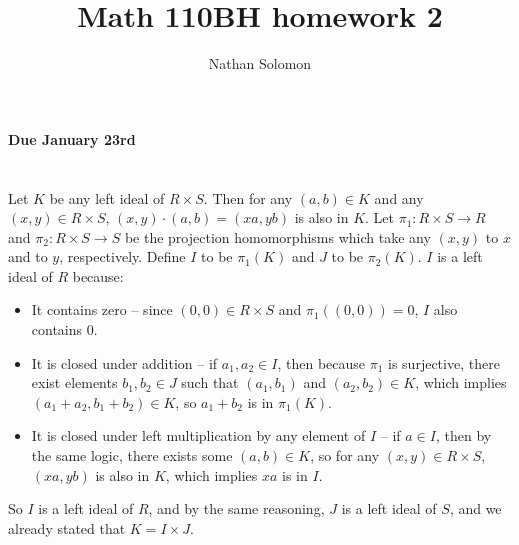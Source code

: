 \documentclass[12pt]{article}
\begin{document}
\title{Math 110BH homework 2}
\author{Nathan Solomon}
\maketitle

\textbf{Due January 23rd}

\section{}
\noindent{}\bigskip\par
Let $K$ be any left ideal of $R \times S$. Then for any $(a,b) \in K$ and any $(x,y) \in R \times S$, $(x,y)\cdot(a,b)=(xa,yb)$ is also in $K$. Let $\pi_1: R \times S \rightarrow R$ and $\pi_2: R \times S \rightarrow S$ be the projection homomorphisms which take any $(x,y)$ to $x$ and to $y$, respectively. Define $I$ to be $\pi_1(K)$ and $J$ to be $\pi_2(K)$. $I$ is a left ideal of $R$ because:
\begin{itemize}
    \item It contains zero -- since $(0,0) \in R \times S$ and $\pi_1((0,0)) = 0$, $I$ also contains 0.
    \item It is closed under addition -- if $a_1, a_2 \in I$, then because $\pi_1$ is surjective, there exist elements $b_1, b_2 \in J$ such that $(a_1, b_1)$ and $(a_2, b_2) \in K$, which implies $(a_1 + a_2, b_1 + b_2) \in K$, so $a_1 + b_2$ is in $\pi_1(K)$.
    \item It is closed under left multiplication by any element of $I$ -- if $a \in I$, then by the same logic, there exists some $(a,b) \in K$, so for any $(x,y) \in R \times S$, $(xa, yb)$ is also in $K$, which implies $xa$ is in $I$.
\end{itemize}
So $I$ is a left ideal of $R$, and by the same reasoning, $J$ is a left ideal of $S$, and we already stated that $K = I \times J$.
\end{document}
